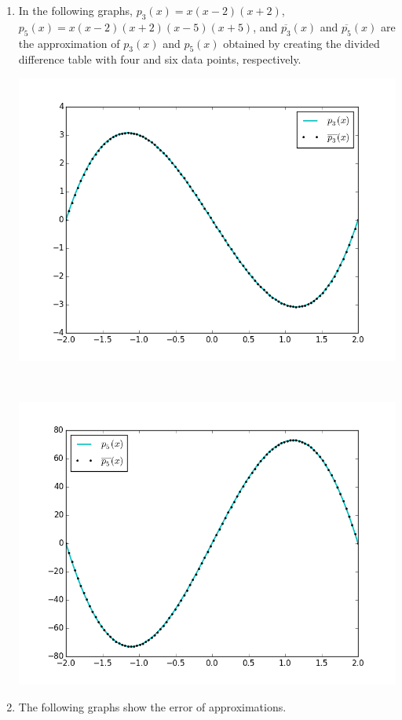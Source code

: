 \documentclass[12pt]{article}
\begin{document}
\begin{enumerate}[\ \ (a)\ \ ]
\item In the following graphs, $p_3(x) = x(x-2)(x+2)$, $p_5(x) = x(x-2)(x+2)(x-5)(x+5)$, and $\overline{p_3}(x)$ and $\overline{p_5}(x)$ are the approximation of $p_3(x)$ and $p_5(x)$ obtained by creating the divided difference table with four and six data points, respectively.
\centerline{\includegraphics[scale=0.65]{figures/problem3_a.png}}\\
\centerline{\includegraphics[scale=0.65]{figures/problem3_b.png}}
\item The following graphs show the error of approximations.\\

\end{enumerate}
\end{document}
